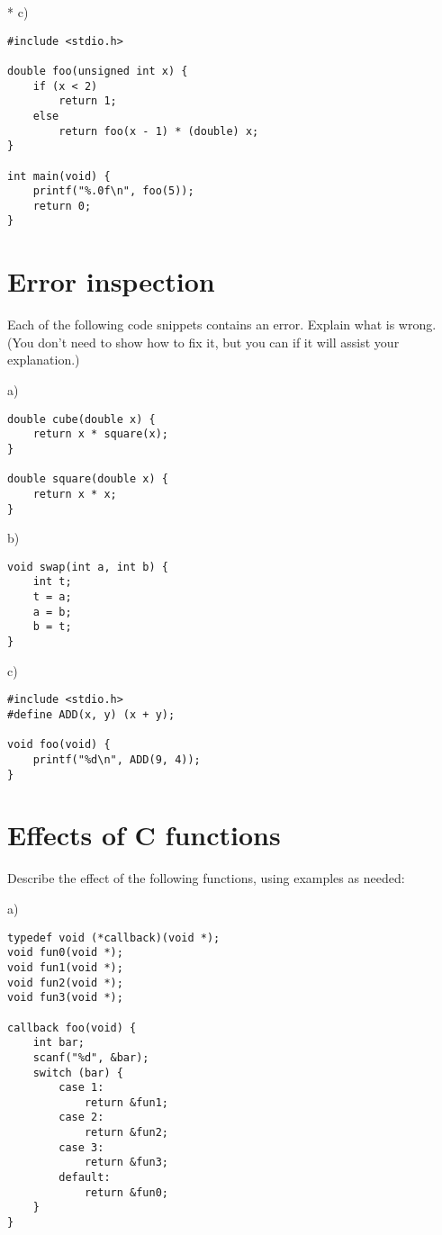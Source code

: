 \documentclass[a4paper,12pt]{article}
\begin{document}
* c) %

\begin{lstlisting}
#include <stdio.h>

double foo(unsigned int x) {
	if (x < 2)
		return 1;
	else
		return foo(x - 1) * (double) x;
}

int main(void) {
	printf("%.0f\n", foo(5));
	return 0;
}
\end{lstlisting}

\newpage

\section{Error inspection}

Each of the following code snippets contains an error. Explain what is
wrong. (You don't need to show how to fix it, but you can if it will
assist your explanation.)

a) %

\begin{lstlisting}
double cube(double x) {
	return x * square(x);
}

double square(double x) {
	return x * x;
}
\end{lstlisting}

b) %

\begin{lstlisting}
void swap(int a, int b) {
	int t;
	t = a;
	a = b;
	b = t;
}
\end{lstlisting}

c) %

\begin{lstlisting}
#include <stdio.h>
#define ADD(x, y) (x + y);

void foo(void) {
	printf("%d\n", ADD(9, 4));
}
\end{lstlisting}

\newpage

\section{Effects of C functions}

Describe the effect of the following functions, using examples as
needed:

a)

\begin{lstlisting}
typedef void (*callback)(void *);
void fun0(void *);
void fun1(void *);
void fun2(void *);
void fun3(void *);

callback foo(void) {
	int bar;
	scanf("%d", &bar);
	switch (bar) {
		case 1:
			return &fun1;
		case 2:
			return &fun2;
		case 3:
			return &fun3;
		default:
			return &fun0;
	}
}
\end{lstlisting}
\end{document}
